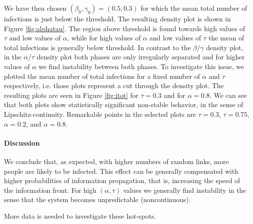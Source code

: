 \documentclass[11pt]{article}
\begin{document}
We have then chosen $(\beta_0,\gamma_0) = (0.5,0.3)$ for which the mean total number of infections is just below the threshold. The resulting density plot is shown in Figure \ref{fig:alphatau}. The region above threshold is found towards high values of $\tau$ and low values of $\alpha$, while for high values of $\alpha$ and low values of $\tau$ the mean of total infections is generally below threshold. In contrast to the $\beta/\gamma$ density plot, in the $\alpha/\tau$ density plot both phases are only irregularly separated and for higher values of $\alpha$ we find instability between both phases. To investigate this issue, we plotted the mean number of total infections for a fixed number of $\alpha$ and $\tau$ respectively, i.e. those plots represent a cut through the density plot. The resulting plots are seen in Figure \ref{fig:itot} for $\tau = 0.3$ and for $\alpha = 0.8$. We can see that both plots show statistically significant non-stable behavior, in the sense of Lipschitz-continuity. Remarkable points in the selected plots are $\tau = 0.3$, $\tau = 0.75$, $\alpha = 0.2$, and $\alpha = 0.8$.

\paragraph{Discussion}
We conclude that, as expected, with higher numbers of random links, more people are likely to be infected. This effect can be generally compensated with higher probabilities of information propagation, that is, increasing the speed of the information front. For high $(\alpha,\tau)$ values we generally find instability in the sense that the system becomes unpredictable (noncontinuous).

More data is needed to investigate these hot-spots.
\end{document}
